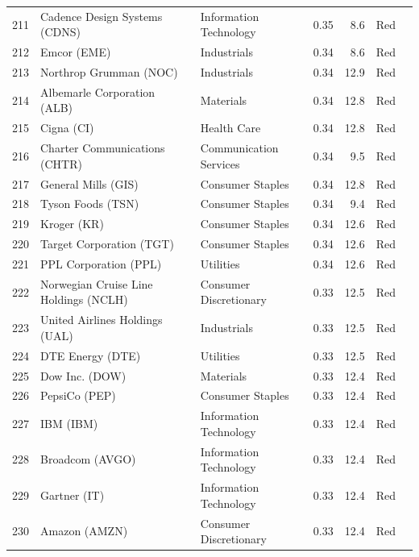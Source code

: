 \documentclass[11pt,a4paper]{article}
\begin{document}
{\begin{longtable}{r p{4.4cm} p{2.8cm} r r l l}
211 & Cadence Design Systems (CDNS) & Information Technology & 0.35 & 8.6 & \cellcolor[HTML]{F4B6B6}Red &  \\
212 & Emcor (EME) & Industrials & 0.34 & 8.6 & \cellcolor[HTML]{F4B6B6}Red &  \\
213 & Northrop Grumman (NOC) & Industrials & 0.34 & 12.9 & \cellcolor[HTML]{F4B6B6}Red &  \\
214 & Albemarle Corporation (ALB) & Materials & 0.34 & 12.8 & \cellcolor[HTML]{F4B6B6}Red &  \\
215 & Cigna (CI) & Health Care & 0.34 & 12.8 & \cellcolor[HTML]{F4B6B6}Red &  \\
216 & Charter Communications (CHTR) & Communication Services & 0.34 & 9.5 & \cellcolor[HTML]{F4B6B6}Red &  \\
217 & General Mills (GIS) & Consumer Staples & 0.34 & 12.8 & \cellcolor[HTML]{F4B6B6}Red &  \\
218 & Tyson Foods (TSN) & Consumer Staples & 0.34 & 9.4 & \cellcolor[HTML]{F4B6B6}Red &  \\
219 & Kroger (KR) & Consumer Staples & 0.34 & 12.6 & \cellcolor[HTML]{F4B6B6}Red &  \\
220 & Target Corporation (TGT) & Consumer Staples & 0.34 & 12.6 & \cellcolor[HTML]{F4B6B6}Red &  \\
221 & PPL Corporation (PPL) & Utilities & 0.34 & 12.6 & \cellcolor[HTML]{F4B6B6}Red &  \\
222 & Norwegian Cruise Line Holdings (NCLH) & Consumer Discretionary & 0.33 & 12.5 & \cellcolor[HTML]{F4B6B6}Red &  \\
223 & United Airlines Holdings (UAL) & Industrials & 0.33 & 12.5 & \cellcolor[HTML]{F4B6B6}Red &  \\
224 & DTE Energy (DTE) & Utilities & 0.33 & 12.5 & \cellcolor[HTML]{F4B6B6}Red &  \\
225 & Dow Inc. (DOW) & Materials & 0.33 & 12.4 & \cellcolor[HTML]{F4B6B6}Red &  \\
226 & PepsiCo (PEP) & Consumer Staples & 0.33 & 12.4 & \cellcolor[HTML]{F4B6B6}Red &  \\
227 & IBM (IBM) & Information Technology & 0.33 & 12.4 & \cellcolor[HTML]{F4B6B6}Red &  \\
228 & Broadcom (AVGO) & Information Technology & 0.33 & 12.4 & \cellcolor[HTML]{F4B6B6}Red &  \\
229 & Gartner (IT) & Information Technology & 0.33 & 12.4 & \cellcolor[HTML]{F4B6B6}Red &  \\
230 & Amazon (AMZN) & Consumer Discretionary & 0.33 & 12.4 & \cellcolor[HTML]{F4B6B6}Red &  \\

\end{longtable}}
\end{document}
